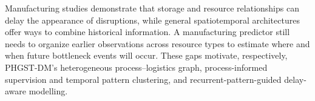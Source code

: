  Manufacturing studies demonstrate that storage and resource relationships can delay the appearance of disruptions, while general spatiotemporal architectures offer ways to combine historical information. A manufacturing predictor still needs to organize earlier observations across resource types to estimate where and when future bottleneck events will occur. These gaps motivate, respectively, PHGST-DM's heterogeneous process--logistics graph, process-informed supervision and temporal pattern clustering, and recurrent-pattern-guided delay-aware modelling.

